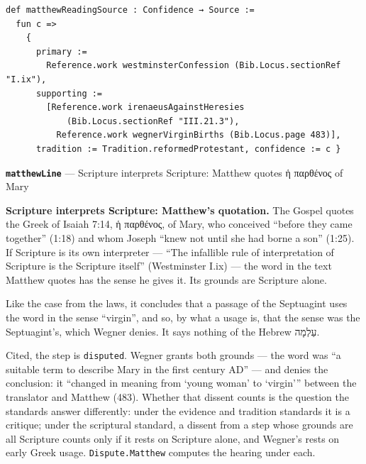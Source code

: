 \documentclass[11pt]{article}
\begin{document}
{\small\begin{verbatim}
def matthewReadingSource : Confidence → Source :=
  fun c =>
    {
      primary :=
        Reference.work westminsterConfession (Bib.Locus.sectionRef "I.ix"),
      supporting :=
        [Reference.work irenaeusAgainstHeresies
            (Bib.Locus.sectionRef "III.21.3"),
          Reference.work wegnerVirginBirths (Bib.Locus.page 483)],
      tradition := Tradition.reformedProtestant, confidence := c }
\end{verbatim}}
\par\medskip\noindent\textbf{\texttt{matthew\allowbreak{}Line}} --- Scripture interprets Scripture: Matthew quotes ἡ παρθένος of Mary\par\nobreak\noindent
\textbf{Scripture interprets Scripture: Matthew’s quotation.} The Gospel quotes the Greek of Isaiah 7:14, ἡ παρθένος, of Mary, who conceived “before they came together” (1:18) and whom Joseph “knew not until she had borne a son” (1:25). If Scripture is its own interpreter — “The infallible rule of interpretation of Scripture is the Scripture itself” (Westminster I.ix) — the word in the text Matthew quotes has the sense he gives it. Its grounds are Scripture alone.

Like the case from the laws, it concludes that a passage of the Septuagint uses the word in the sense “virgin”, and so, by what a usage is, that the sense was the Septuagint’s, which Wegner denies. It says nothing of the Hebrew עַלְמָה.

Cited, the step is \texttt{disputed}. Wegner grants both grounds — the word was “a suitable term to describe Mary in the first century AD” — and denies the conclusion: it “changed in meaning from ‘young woman’ to ‘virgin’” between the translator and Matthew (483). Whether that dissent counts is the question the standards answer differently: under the evidence and tradition standards it is a critique; under the scriptural standard, a dissent from a step whose grounds are all Scripture counts only if it rests on Scripture alone, and Wegner’s rests on early Greek usage. \texttt{Dispute.Matthew} computes the hearing under each.
\end{document}
